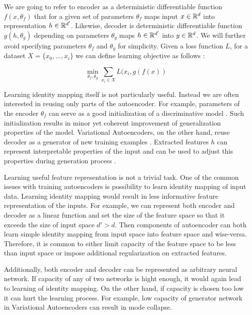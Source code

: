 


We are going to refer to encoder as a deterministic differentiable function $f(x, \theta_f)$ that for a given set of parameters $\theta_f$ maps input $x\in \Bbb{R}^d$ into representation $h \in \Bbb{R}^{d'}$.
Likewise, decoder is deterministic differentiable function $g(h, \theta_g)$ depending on parameters $\theta_g$ maps $h\in\Bbb{R}^{d'}$ into $y\in \Bbb{R}^d$. We will further avoid specifying parameters $\theta_f$ and $\theta_g$ for simplicity.
Given a loss function $L$, for a dataset $X=\{x_0, ..., x_i\}$ we can define learning objective as follows \cite{Good2016}:

\begin{equation}\label{eq:ae}
\min_{\theta_f, \theta_g}\sum\limits_{x_i \in X}{L(x_i, g(f(x))}
\end{equation}

Learning identity mapping itself is not particularly useful.
Instead we are often interested in reusing only parts of the autoencoder.
For example, parameters of the encoder $\theta_f$ can serve as a good initialization of a discriminative model \cite{Masci2011, Vincent2010, Zhao2015}.
Such initialization results in minor yet coherent improvement of generalization properties of the model.
Variational Autoencoders, on the other hand, reuse decoder as a generator of new training examples \cite{Kingma2013}.
Extracted features $h$ can represent interpretable properties of the input and can be used to adjust this
properties during generation process \cite{Kulkarni2015, Whitney2016}.

Learning useful feature representation is not a trivial task.
One of the common issues with training autoencoders is possibility to learn identity mapping of input data.
Learning identity mapping would result in less informative feature representation of the inputs.
For example, we can represent both encoder and decoder as a linear function and set the size of the feature space so that it exceeds the size of input space $d' > d$.
Then components of autoencoder can both learn simple identity mapping from input space into feature space and wise-versa.
Therefore, it is common to either limit capacity of the feature space to be less than input space or impose additional regularization on extracted features.

Additionally, both encoder and decoder can be represented as arbitrary neural network.
If capacity of any of two networks is hight enough, it would again lead to learning of identity mapping.
On the other hand, if capacity is chosen too low it can hurt the learning process.
For example, low capacity of generator network in Variational Autoencoders can result in mode collapse.

